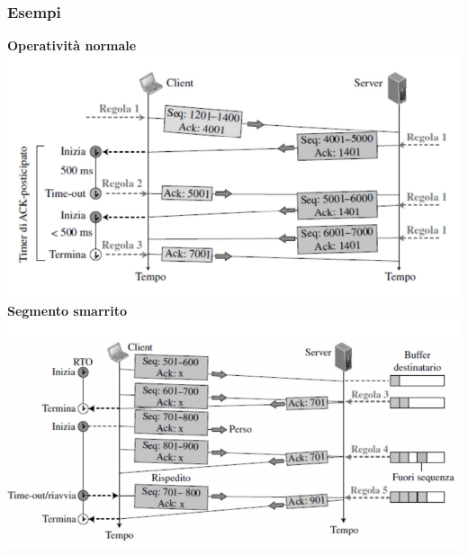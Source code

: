 \documentclass[10pt]{article}
\begin{document}
\subsubsection{Esempi}
\begin{center}
\textbf{Operatività normale}
\includegraphics[scale=0.65]{tcpnorm.png}\\
\textbf{Segmento smarrito}
\includegraphics[scale=0.68]{tcplostsegm.png}
\pagebreak



\end{center}
\end{document}
